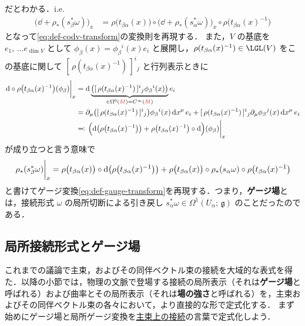 \documentclass[TQFT_main]{subfiles}
\begin{document}
だとわかる．i.e.
\begin{align}
    \bigl(\dd + \rho_* (s^*_\beta \omega)\bigr)_x &= \rho \bigl( t_{\beta\alpha}(x) \bigr) \circ \bigl( \dd + \rho_* (s^*_\alpha \omega) \bigr)_x \circ \rho\bigl(t_{\beta\alpha}(x)^{-1}\bigr)
\end{align}
となって\eqref{eq:def-codv-transform}の変換則を再現する．
また，$V$ の基底を $e_1,\, \dots e_{\dim V}$ として $\phi_\beta(x) = \phi_\beta{}^i (x) e_i$ と展開し，$\rho (t_{\beta\alpha}(x)^{-1}) \in \LGL (V)$ をこの基底に関して $[\, \rho (t_{\beta\alpha}(x)^{-1})\, ]^{i}{}_j$ と行列表示ときに
\begin{align}
    \eval{\dd \circ \rho \bigl( t_{\beta\alpha}(x)^{-1} \bigr) (\phi_\beta)}_x 
    &= \dd\underbrace{\bigl([\, \rho (t_{\beta\alpha}(x)^{-1})\, ]^{i}{}_j \phi_\beta{}^i (x) \bigr)}_{\in \Omega^0(\textcolor{red}{M}) = C^\infty(\textcolor{red}{M})} e_i \\
    &= \partial_\mu \bigl([\, \rho (t_{\beta\alpha}(x)^{-1})\, ]^{i}{}_j \bigr) \phi_{\beta}{}^i (x) \dd{x}^\mu e_i + [\, \rho (t_{\beta\alpha}(x)^{-1})\, ]^{i}{}_j \partial_{\mu} \phi_\beta{}^j (x) \dd{x}^\mu e_i \\
    &\eqqcolon \eval{\Bigl(\dd \bigl(\rho \bigl( t_{\beta\alpha}(x)^{-1} \bigr) \bigr) + \rho \bigl( t_{\beta\alpha}(x)^{-1} \bigr) \circ \dd\Bigr) (\phi_\beta)}_x
\end{align}
が成り立つと言う意味で
\begin{align}
    \eval{\rho_* (s_\beta^* \omega)}_x = \rho \bigl( t_{\beta\alpha}(x) \bigr) \circ \dd \bigl(\rho \bigl( t_{\beta\alpha}(x)^{-1} \bigr)\bigr) + \rho \bigl( t_{\beta\alpha}(x) \bigr) \circ \rho_* (s_\alpha \omega) \circ \rho \bigl( t_{\beta\alpha}(x)^{-1} \bigr)
\end{align}
と書けてゲージ変換\eqref{eq:def-gauge-transform}を再現する．つまり，\textbf{ゲージ場}とは，接続形式 $\omega$ の局所切断による引き戻し $s_\alpha^* \omega \in \Omega^1(U_\alpha;\, \mathfrak{g})$ のことだったのである．

\subsection{局所接続形式とゲージ場}

これまでの議論で主束，およびその同伴ベクトル束の接続を大域的な表式を得た．以降の小節では，物理の文脈で登場する接続の局所表示（それは\textbf{ゲージ場}と呼ばれる）および曲率とその局所表示（それは\textbf{場の強さ}と呼ばれる）を，主束およびその同伴ベクトル束の各々において，より直接的な形で定式化する．
まず始めにゲージ場と局所ゲージ変換を\hyperref[def:connection]{主束上の接続}の言葉で定式化しよう．
\end{document}
